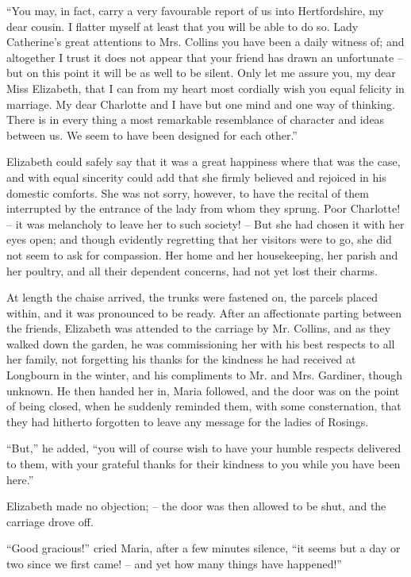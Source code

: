 “You may, in fact, carry a very favourable report of
us into Hertfordshire, my dear cousin. I flatter myself
at least that you will be able to do so. Lady Catherine’s
great attentions to Mrs. Collins you have been a daily
witness of; and altogether I trust it does not appear
that your friend has drawn an unfortunate -- but on this
point it will be as well to be silent. Only let me assure
you, my dear Miss Elizabeth, that I can from my heart
most cordially wish you equal felicity in marriage. My
dear Charlotte and I have but one mind and one way of
thinking. There is in every thing a most remarkable
resemblance of character and ideas between us. We seem
to have been designed for each other.”

Elizabeth could safely say that it was a great happiness
where that was the case, and with equal sincerity could
add that she firmly believed and rejoiced in his domestic
comforts. She was not sorry, however, to have the recital
of them interrupted by the entrance of the lady from whom
they sprung. Poor Charlotte! -- it was melancholy to
leave her to such society! -- But she had chosen it with
her eyes open; and though evidently regretting that her
visitors were to go, she did not seem to ask for compassion.
Her home and her housekeeping, her parish and her
poultry, and all their dependent concerns, had not yet
lost their charms.

At length the chaise arrived, the trunks were fastened
on, the parcels placed within, and it was pronounced to
be ready. After an affectionate parting between the
friends, Elizabeth was attended to the carriage by Mr.
Collins, and as they walked down the garden, he was
commissioning her with his best respects to all her family,
not forgetting his thanks for the kindness he had received
at Longbourn in the winter, and his compliments to Mr.
and Mrs. Gardiner, though unknown. He then handed
her in, Maria followed, and the door was on the point
of being closed, when he suddenly reminded them, with
some consternation, that they had hitherto forgotten to
leave any message for the ladies of Rosings.

“But,” he added, “you will of course wish to have
your humble respects delivered to them, with your grateful
thanks for their kindness to you while you have been here.”

Elizabeth made no objection; -- the door was then
allowed to be shut, and the carriage drove off.

“Good gracious!” cried Maria, after a few minutes
silence, “it seems but a day or two since we first came! -- and
yet how many things have happened!”

